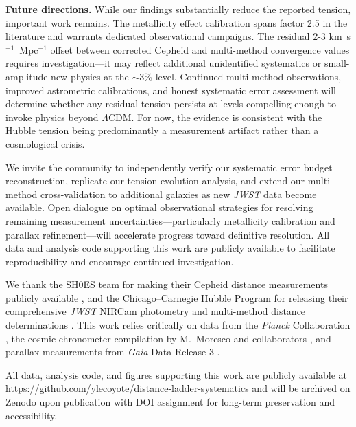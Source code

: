 \documentclass[preprint, linenumbers]{aastex701}
\begin{document}
\textbf{Future directions.} While our findings substantially reduce the reported tension, important work remains. The metallicity effect calibration spans factor 2.5 in the literature and warrants dedicated observational campaigns. The residual 2-3 km~s$^{-1}$~Mpc$^{-1}$ offset between corrected Cepheid and multi-method convergence values requires investigation---it may reflect additional unidentified systematics or small-amplitude new physics at the $\sim$3\% level. Continued multi-method observations, improved astrometric calibrations, and honest systematic error assessment will determine whether any residual tension persists at levels compelling enough to invoke physics beyond $\Lambda$CDM. For now, the evidence is consistent with the Hubble tension being predominantly a measurement artifact rather than a cosmological crisis.

We invite the community to independently verify our systematic error budget reconstruction, replicate our tension evolution analysis, and extend our multi-method cross-validation to additional galaxies as new \textit{JWST} data become available. Open dialogue on optimal observational strategies for resolving remaining measurement uncertainties---particularly metallicity calibration and parallax refinement---will accelerate progress toward definitive resolution. All data and analysis code supporting this work are publicly available to facilitate reproducibility and encourage continued investigation.


\begin{acknowledgments}
We thank the SH0ES team for making their Cepheid distance measurements publicly available
\citep{Riess2022,Riess2024JWST}, and the Chicago–Carnegie Hubble Program for releasing their comprehensive
\textit{JWST} NIRCam photometry and multi-method distance determinations \citep{Freedman2025a}.
This work relies critically on data from the \textit{Planck} Collaboration \citep{Planck2018},
the cosmic chronometer compilation by M.~Moresco and collaborators \citep{Moresco2022},
and parallax measurements from \textit{Gaia} Data Release 3 \citep{Lindegren2021}.



All data, analysis code, and figures supporting this work are publicly available at \url{https://github.com/ylecoyote/distance-ladder-systematics} and will be archived on Zenodo upon publication with DOI assignment for long-term preservation and accessibility.
\end{acknowledgments}
\end{document}
